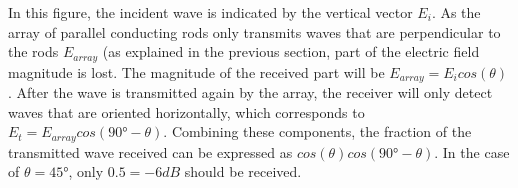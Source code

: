 In this figure, the incident wave is indicated by the vertical vector $E_i$. As the array of parallel conducting rods only transmits waves that are perpendicular to the rods  $E_{array}$ (as explained in the previous section, part of the electric field magnitude is lost. The magnitude of the received part will be $E_{array} = E_icos(\theta)$. After the wave is transmitted again by the array, the receiver will only detect waves that are oriented horizontally, which corresponds to $E_t = E_{array}cos(90\si{\degree}-\theta)$. Combining these components, the fraction of the transmitted wave received can be expressed as $cos(\theta)cos(90\si{\degree}-\theta)$. In the case of $\theta=45\si{\degree}$, only $0.5 = -6 dB$ should be received. 